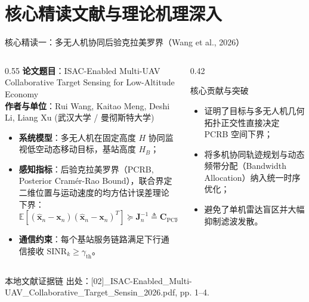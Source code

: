 \documentclass[aspectratio=169, 10pt]{ctexbeamer}
\begin{document}
\section{核心精读文献与理论机理深入}
\begin{frame}{核心精读一：多无人机协同后验克拉美罗界（Wang et al., 2026）}
  \begin{columns}
    \begin{column}{0.55\textwidth}
      \textbf{论文题目}：ISAC-Enabled Multi-UAV Collaborative Target Sensing for Low-Altitude Economy\\
      \textbf{作者与单位}：Rui Wang, Kaitao Meng, Deshi Li, Liang Xu (武汉大学 / 曼彻斯特大学)
      \begin{itemize}
        \item \textbf{系统模型}：多无人机在固定高度 $H$ 协同监视低空动态移动目标，基站高度 $H_B$；
        \item \textbf{感知指标}：后验克拉美罗界（PCRB, Posterior Cramér-Rao Bound），联合界定二维位置与运动速度的均方估计误差理论下界：
        \begin{equation*}
          \mathbb{E}\left[(\hat{\mathbf{x}}_n - \mathbf{x}_n)(\hat{\mathbf{x}}_n - \mathbf{x}_n)^T\right] \succeq \mathbf{J}_n^{-1} \triangleq \mathbf{C}_{\mathrm{PCRB}, n}
        \end{equation*}
        \item \textbf{通信约束}：每个基站服务链路满足下行通信接收 $\mathrm{SINR}_k \ge \gamma_{\mathrm{th}}$。
      \end{itemize}
    \end{column}
    \begin{column}{0.42\textwidth}
      \begin{block}{核心贡献与突破}
        \begin{itemize}
          \item 证明了目标与多无人机几何拓扑正交性直接决定 PCRB 空间下界；
          \item 将多机协同轨迹规划与动态频带分配（Bandwidth Allocation）纳入统一时序优化；
          \item 避免了单机雷达盲区并大幅抑制滤波发散。
        \end{itemize}
      \end{block}
    \end{column}
  \end{columns}

  \begin{block}{本地文献证据链}
    \footnotesize \textcolor{evidencegray}{出处：[02]\_ISAC-Enabled\_Multi-UAV\_Collaborative\_Target\_Sensin\_2026.pdf, pp. 1--4.}
  \end{block}
\end{frame}
\end{document}
